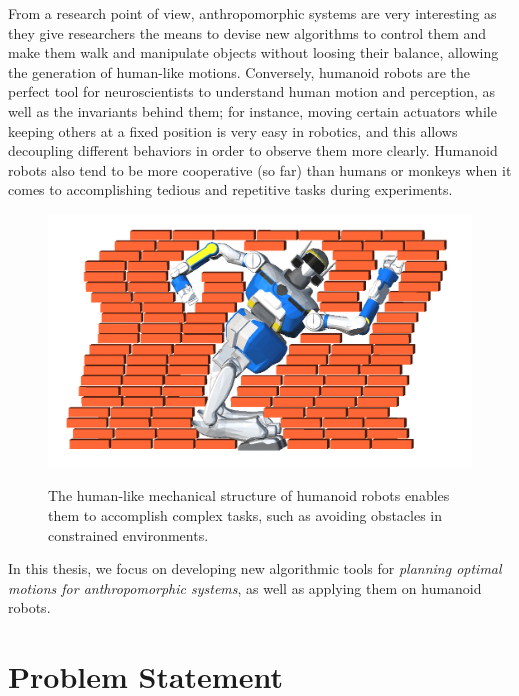 From a research point of view, anthropomorphic systems are very
interesting as they give researchers the means to devise new
algorithms to control them and make them walk and manipulate objects
without loosing their balance, allowing the generation of human-like
motions. Conversely, humanoid robots are the perfect tool for
neuroscientists to understand human motion and perception, as well as
the invariants behind them; for instance, moving certain actuators
while keeping others at a fixed position is very easy in robotics, and
this allows decoupling different behaviors in order to observe them
more clearly. Humanoid robots also tend to be more cooperative (so
far) than humans or monkeys when it comes to accomplishing tedious and
repetitive tasks during experiments.

\begin{figure}
  \centering
      {\includegraphics[width = 0.7\linewidth]
        {src/chap0-introduction/hrp2-brick-wall.png}}
      \caption{The human-like mechanical structure of humanoid robots
        enables them to accomplish complex tasks, such as avoiding
        obstacles in constrained environments.}
      \label{fig:chap0-hrp2-brick-wall}
\end{figure}

In this thesis, we focus on developing new algorithmic tools for
\emph{planning optimal motions for anthropomorphic systems}, as well
as applying them on humanoid robots.

\section{Problem Statement}

